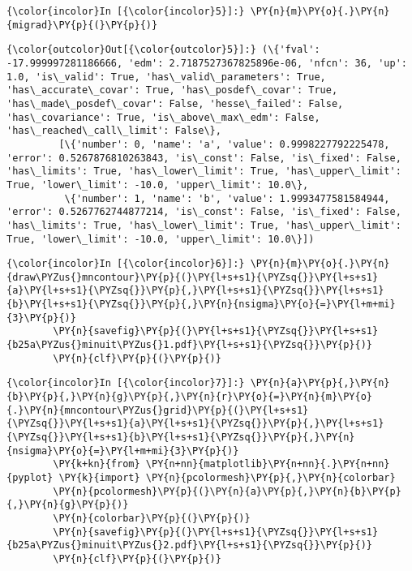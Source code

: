    \begin{Verbatim}[commandchars=\\\{\}]
{\color{incolor}In [{\color{incolor}5}]:} \PY{n}{m}\PY{o}{.}\PY{n}{migrad}\PY{p}{(}\PY{p}{)}
\end{Verbatim}


    
    
    
    
    
    
    
    
\begin{Verbatim}[commandchars=\\\{\}]
{\color{outcolor}Out[{\color{outcolor}5}]:} (\{'fval': -17.999997281186666, 'edm': 2.7187527367825896e-06, 'nfcn': 36, 'up': 1.0, 'is\_valid': True, 'has\_valid\_parameters': True, 'has\_accurate\_covar': True, 'has\_posdef\_covar': True, 'has\_made\_posdef\_covar': False, 'hesse\_failed': False, 'has\_covariance': True, 'is\_above\_max\_edm': False, 'has\_reached\_call\_limit': False\},
         [\{'number': 0, 'name': 'a', 'value': 0.9998227792225478, 'error': 0.5267876810263843, 'is\_const': False, 'is\_fixed': False, 'has\_limits': True, 'has\_lower\_limit': True, 'has\_upper\_limit': True, 'lower\_limit': -10.0, 'upper\_limit': 10.0\},
          \{'number': 1, 'name': 'b', 'value': 1.9993477581584944, 'error': 0.5267762744877214, 'is\_const': False, 'is\_fixed': False, 'has\_limits': True, 'has\_lower\_limit': True, 'has\_upper\_limit': True, 'lower\_limit': -10.0, 'upper\_limit': 10.0\}])
\end{Verbatim}
            
    \begin{Verbatim}[commandchars=\\\{\}]
{\color{incolor}In [{\color{incolor}6}]:} \PY{n}{m}\PY{o}{.}\PY{n}{draw\PYZus{}mncontour}\PY{p}{(}\PY{l+s+s1}{\PYZsq{}}\PY{l+s+s1}{a}\PY{l+s+s1}{\PYZsq{}}\PY{p}{,}\PY{l+s+s1}{\PYZsq{}}\PY{l+s+s1}{b}\PY{l+s+s1}{\PYZsq{}}\PY{p}{,}\PY{n}{nsigma}\PY{o}{=}\PY{l+m+mi}{3}\PY{p}{)}
        \PY{n}{savefig}\PY{p}{(}\PY{l+s+s1}{\PYZsq{}}\PY{l+s+s1}{b25a\PYZus{}minuit\PYZus{}1.pdf}\PY{l+s+s1}{\PYZsq{}}\PY{p}{)}
        \PY{n}{clf}\PY{p}{(}\PY{p}{)}
\end{Verbatim}


    \begin{Verbatim}[commandchars=\\\{\}]
{\color{incolor}In [{\color{incolor}7}]:} \PY{n}{a}\PY{p}{,}\PY{n}{b}\PY{p}{,}\PY{n}{g}\PY{p}{,}\PY{n}{r}\PY{o}{=}\PY{n}{m}\PY{o}{.}\PY{n}{mncontour\PYZus{}grid}\PY{p}{(}\PY{l+s+s1}{\PYZsq{}}\PY{l+s+s1}{a}\PY{l+s+s1}{\PYZsq{}}\PY{p}{,}\PY{l+s+s1}{\PYZsq{}}\PY{l+s+s1}{b}\PY{l+s+s1}{\PYZsq{}}\PY{p}{,}\PY{n}{nsigma}\PY{o}{=}\PY{l+m+mi}{3}\PY{p}{)}
        \PY{k+kn}{from} \PY{n+nn}{matplotlib}\PY{n+nn}{.}\PY{n+nn}{pyplot} \PY{k}{import} \PY{n}{pcolormesh}\PY{p}{,}\PY{n}{colorbar}
        \PY{n}{pcolormesh}\PY{p}{(}\PY{n}{a}\PY{p}{,}\PY{n}{b}\PY{p}{,}\PY{n}{g}\PY{p}{)}
        \PY{n}{colorbar}\PY{p}{(}\PY{p}{)}
        \PY{n}{savefig}\PY{p}{(}\PY{l+s+s1}{\PYZsq{}}\PY{l+s+s1}{b25a\PYZus{}minuit\PYZus{}2.pdf}\PY{l+s+s1}{\PYZsq{}}\PY{p}{)}
        \PY{n}{clf}\PY{p}{(}\PY{p}{)}
\end{Verbatim}


